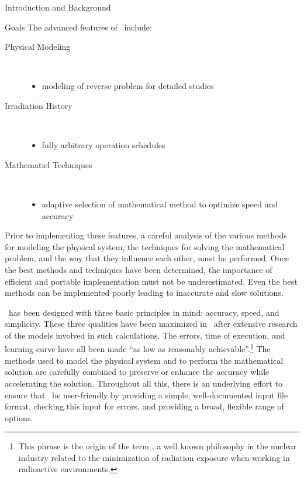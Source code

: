 \begin{chapter}{Introduction and Background}
\begin{section}{Goals}
    \noindent The advanced features of \ALARA\ include:
    \begin{description}
    \item[Physical Modeling]\ \\
      \vspace*{-1cm}
      \begin{itemize}
      \item modeling of reverse problem for detailed studies
      \end{itemize}
    \item[Irradiation History]\ \\
      \vspace*{-1cm}
      \begin{itemize}
      \item fully arbitrary operation schedules
      \end{itemize}
    \item[Mathematicl Techniques]\ \\
      \vspace*{-1cm}
      \begin{itemize}
      \item adaptive selection of mathematical method to optimize
        speed and accuracy
      \end{itemize}
    \end{description}
    \renewcommand{\baselinestretch}{1.66}\normalsize
    
    Prior to implementing these features, a careful analysis of the
    various methods for modeling the physical system, the techniques
    for solving the mathematical problem, and the way that they
    influence each other, must be performed.  Once the best methods and
    techniques have been determined, the importance of efficient and
    portable implementation must not be underestimated.  Even the best
    methods can be implemented poorly leading to inaccurate and slow
    solutions.
    
    \ALARA\ has been designed with three basic principles in mind:
    accuracy, speed, and simplicity.  These three qualities have been
    maximized in \ALARA\ after extensive research of the models
    involved in such calculations.  The errors, time of execution, and
    learning curve have all been made ``as low as reasonably
    achievable''.\footnote{This phrase is the origin of the term
      \ALARA, a well known philosophy in the nuclear industry related
      to the minimization of radiation exposure when working in
      radioactive environments.}  The methods used to model the
    physical system and to perform the mathematical solution are
    carefully combined to preserve or enhance the accuracy while
    accelerating the solution.  Throughout all this, there is an
    underlying effort to ensure that \ALARA\ be user-friendly by
    providing a simple, well-documented input file format, checking
    this input for errors, and providing a broad, flexible range of
    options.
    

\end{section}
\end{chapter}
